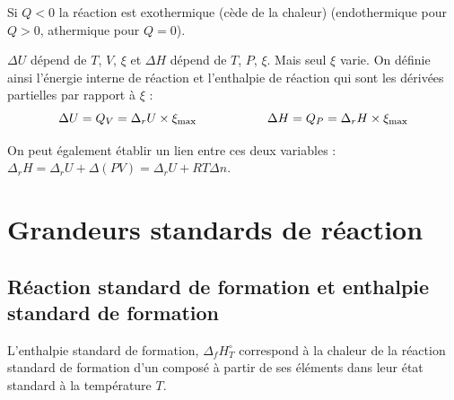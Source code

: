\documentclass[13pt, twoside, a4paper, french]{report}
\begin{document}
        Si $Q < 0$ la réaction est exothermique (cède de la chaleur) (endothermique pour $Q > 0$, athermique pour $Q = 0$).\medskip

        $\Delta U$ dépend de $T$, $V$, $\xi$ et $\Delta H$ dépend de $T$, $P$, $\xi$.
        Mais seul $\xi$ varie.
        On définie ainsi l'énergie interne de réaction et l'enthalpie de réaction qui sont les dérivées partielles par rapport à $\xi$ :
        \[\Delta U = Q_V = \Delta_r U \times \xi_\textrm{max} \hspace*{2cm} \Delta H = Q_P = \Delta_r H \times \xi_\textrm{max}\]

        On peut également établir un lien entre ces deux variables : $\Delta_r H = \Delta_r U + \Delta(PV) = \Delta_r U + RT \Delta n$.


    \section{Grandeurs standards de réaction}


        \subsection{Réaction standard de formation et enthalpie standard de formation}

            L'enthalpie standard de formation, $\Delta_f H^\circ_T$ correspond à la chaleur de la réaction standard de formation d'un composé à partir de ses éléments dans leur état standard à la température $T$.
            \smallskip
\end{document}
